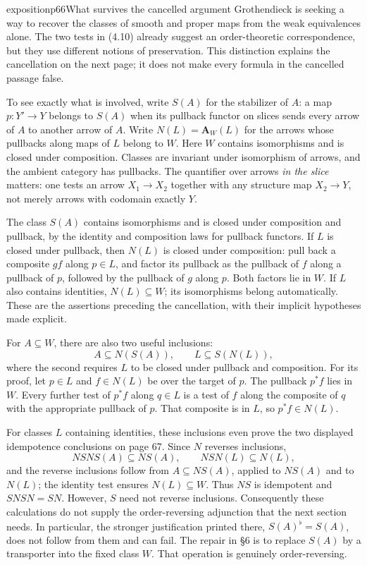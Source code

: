 \begin{dcomment}{exposition}{p66}{What survives the cancelled argument}
Grothendieck is seeking a way to recover the classes of smooth and proper maps from the weak equivalences alone. The two tests in (4.10) already suggest an order-theoretic correspondence, but they use different notions of preservation. This distinction explains the cancellation on the next page; it does not make every formula in the cancelled passage false.

To see exactly what is involved, write $S(A)$ for the stabilizer of $A$: a map $p:Y'\to Y$ belongs to $S(A)$ when its pullback functor on slices sends every arrow of $A$ to another arrow of $A$. Write $N(L)=\mathbf A_W(L)$ for the arrows whose pullbacks along maps of $L$ belong to $W$. Here $W$ contains isomorphisms and is closed under composition. Classes are invariant under isomorphism of arrows, and the ambient category has pullbacks. The quantifier over arrows \emph{in the slice} matters: one tests an arrow $X_1\to X_2$ together with any structure map $X_2\to Y$, not merely arrows with codomain exactly $Y$.

The class $S(A)$ contains isomorphisms and is closed under composition and pullback, by the identity and composition laws for pullback functors. If $L$ is closed under pullback, then $N(L)$ is closed under composition: pull back a composite $gf$ along $p\in L$, and factor its pullback as the pullback of $f$ along a pullback of $p$, followed by the pullback of $g$ along $p$. Both factors lie in $W$. If $L$ also contains identities, $N(L)\subseteq W$; its isomorphisms belong automatically. These are the assertions preceding the cancellation, with their implicit hypotheses made explicit.

For $A\subseteq W$, there are also two useful inclusions:
\[
 A\subseteq N(S(A)),\qquad L\subseteq S(N(L)),
\]
where the second requires $L$ to be closed under pullback and composition. For its proof, let $p\in L$ and $f\in N(L)$ be over the target of $p$. The pullback $p^*f$ lies in $W$. Every further test of $p^*f$ along $q\in L$ is a test of $f$ along the composite of $q$ with the appropriate pullback of $p$. That composite is in $L$, so $p^*f\in N(L)$.

For classes $L$ containing identities, these inclusions even prove the two displayed idempotence conclusions on page 67. Since $N$ reverses inclusions,
\[
 NSNS(A)\subseteq NS(A),\qquad NSN(L)\subseteq N(L),
\]
and the reverse inclusions follow from $A\subseteq NS(A)$, applied to $NS(A)$ and to $N(L)$; the identity test ensures $N(L)\subseteq W$. Thus $NS$ is idempotent and $SNSN=SN$. However, $S$ need not reverse inclusions. Consequently these calculations do not supply the order-reversing adjunction that the next section needs. In particular, the stronger justification printed there, $S(A)^\flat=S(A)$, does not follow from them and can fail. The repair in \S6 is to replace $S(A)$ by a transporter into the fixed class $W$. That operation is genuinely order-reversing.


\end{dcomment}
